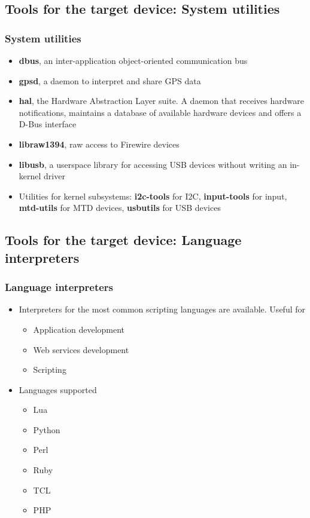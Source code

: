 \subsection[System utilities]{Tools for the target device: System
  utilities}

\begin{frame}
  \frametitle{System utilities}
  \begin{itemize}
  \item {\bf dbus}, an inter-application object-oriented communication bus
  \item {\bf gpsd}, a daemon to interpret and share GPS data
  \item {\bf hal}, the Hardware Abstraction Layer suite. A daemon that
    receives hardware notifications, maintains a database of available
    hardware devices and offers a D-Bus interface
  \item {\bf libraw1394}, raw access to Firewire devices
  \item {\bf libusb}, a userspace library for accessing USB devices
    without writing an in-kernel driver
  \item Utilities for kernel subsystems: {\bf i2c-tools} for I2C, {\bf
      input-tools} for input, {\bf mtd-utils} for MTD devices, {\bf
      usbutils} for USB devices
  \end{itemize}
\end{frame}

\subsection[Language Interpreters]{Tools for the target device:
  Language interpreters}

\begin{frame}
  \frametitle{Language interpreters}
  \begin{itemize}
  \item Interpreters for the most common scripting languages are
    available. Useful for
    \begin{itemize}
    \item Application development
    \item Web services development
    \item Scripting
    \end{itemize}
  \item Languages supported
    \begin{itemize}
    \item Lua
    \item Python
    \item Perl
    \item Ruby
    \item TCL
    \item PHP
    \end{itemize}
  \end{itemize}
\end{frame}

